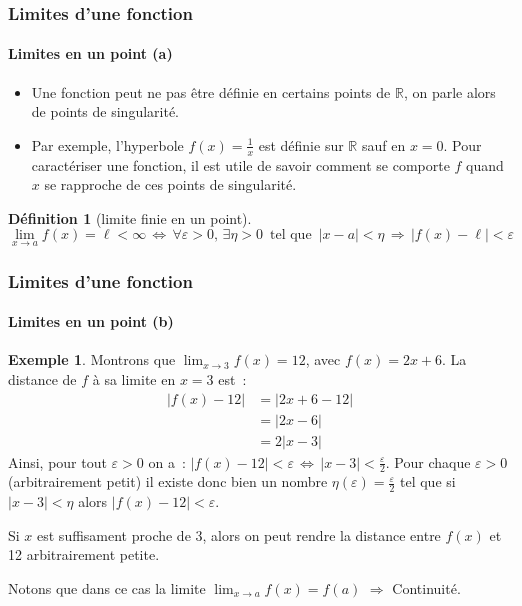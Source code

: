 \documentclass[10pt,notheorems]{beamer}
\theoremstyle{plain}
\theoremstyle{definition} %
\newtheorem{definition}{Définition}
\newtheorem{example}{Exemple}
\begin{document}
\begin{frame}
  \frametitle{Limites d'une fonction}
  \framesubtitle{Limites en un point (a)}

  \begin{itemize}

  \item Une fonction peut ne pas être définie en certains points de $\mathbb R$, on parle alors de points de singularité.\newline

  \item Par exemple, l'hyperbole $f(x)=\frac{1}{x}$ est définie sur $\mathbb R$ sauf en $x=0$. Pour caractériser une fonction, il est utile de savoir comment se comporte $f$ quand $x$ se rapproche de ces points de singularité.\newline

  \end{itemize}

  \begin{definition}[limite finie en un point]
    \[
      \lim_{x\rightarrow a}f(x) = \ell<\infty \,\Leftrightarrow\, \forall\varepsilon>0,\, \exists \eta>0\,\text{ tel que }\, |x-a|<\eta\,\Rightarrow\, |f(x)-\ell|<\varepsilon
    \]
  \end{definition}

\end{frame}


\begin{frame}
  \frametitle{Limites d'une fonction}
  \framesubtitle{Limites en un point (b)}

  \begin{example}
    Montrons que $\lim_{x\rightarrow 3} f(x) = 12$, avec $f(x)=2x+6$. La distance de $f$ à sa limite en $x=3$ est~:
    \[
      \begin{split}
        |f(x)-12| &= |2x+6-12|\\
        &=  |2x-6|\\
        &= 2|x-3|
      \end{split}
    \]
    Ainsi, pour tout $\varepsilon>0$ on a~:
    $|f(x)-12|<\varepsilon \,\Leftrightarrow \, |x-3|<\frac{\varepsilon}{2}$.
    Pour chaque $\varepsilon>0$ (arbitrairement petit) il existe donc bien un nombre $\eta(\varepsilon)=\frac{\varepsilon}{2}$ tel que si $|x-3|<\eta$ alors $|f(x)-12|<\varepsilon$.\newline

    Si $x$ est suffisament proche de 3, alors on peut rendre la distance entre $f(x)$ et 12 arbitrairement petite.\newline

    Notons que dans ce cas la limite $\lim_{x\rightarrow a} f(x)=f(a)$ $\Rightarrow$ Continuité.

  \end{example}

\end{frame}
\end{document}

